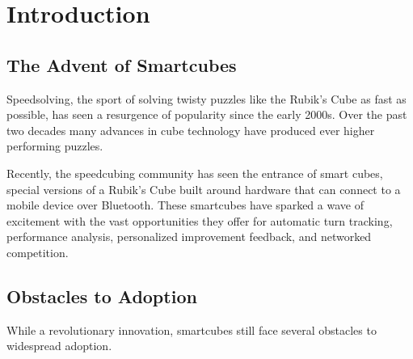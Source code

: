%

\chapter{Introduction} 
\label{Chapter1}


\section{The Advent of Smartcubes}

Speedsolving, the sport of solving twisty puzzles like the Rubik's Cube
as fast as possible, has seen a resurgence of popularity since the
early 2000s. \cite{wca-competition-history} Over the past two decades
many advances in cube technology have produced ever higher performing
puzzles.

Recently, the speedcubing community has seen the entrance of smart
cubes, special versions of a Rubik's Cube built around hardware that
can connect to a mobile device over Bluetooth. These smartcubes have
sparked a wave of excitement with the vast opportunities they offer for
automatic turn tracking, performance analysis, personalized improvement
feedback, and networked competition.


\section{Obstacles to Adoption}

While a revolutionary innovation, smartcubes still face several obstacles to
widespread adoption.

